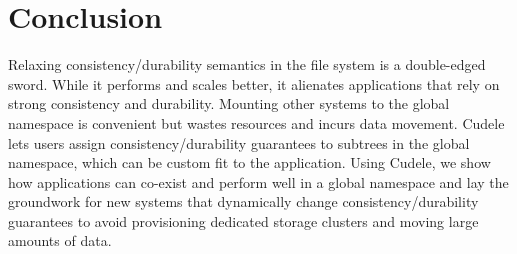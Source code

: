%
%
%
%
%
%
%

\section{Conclusion}

Relaxing consistency/durability semantics in the file system is a double-edged
sword. While it performs and scales better, it alienates applications that rely
on strong consistency and durability. Mounting other systems to the global
namespace is convenient but wastes resources and incurs data movement.  Cudele
lets users assign consistency/durability guarantees to subtrees in the global
namespace, which can be custom fit to the application. Using Cudele, we show
how applications can co-exist and perform well in a global namespace and lay
the groundwork for new systems that dynamically change consistency/durability
guarantees to avoid provisioning dedicated storage clusters and moving large
amounts of data.




